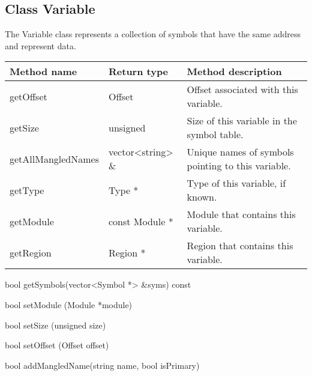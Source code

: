 \subsection{Class Variable}

The Variable class represents a collection of symbols that have the same address and represent data. 

\begin{tabular}{p{1.25in}p{1.125in}p{3.125in}}
	Method name & Return type & Method description \\
	\hline
	getOffset & Offset & Offset associated with this variable. \\
	getSize & unsigned & Size of this variable in the symbol table. \\
	getAllMangledNames & vector<string> \& & Unique names of symbols pointing to this variable. \\
	getType & Type * & Type of this variable, if known. \\
	getModule & const Module * & Module that contains this variable. \\
	getRegion & Region * & Region that contains this variable. \\
\end{tabular}

\begin{apient}
bool getSymbols(vector<Symbol *> &syms) const
\end{apient}

\begin{apient}
bool setModule (Module *module)
\end{apient}

\begin{apient}
bool setSize (unsigned size)
\end{apient}

\begin{apient}
bool setOffset (Offset offset)
\end{apient}

\begin{apient}
bool addMangledName(string name, bool isPrimary)
\end{apient}

